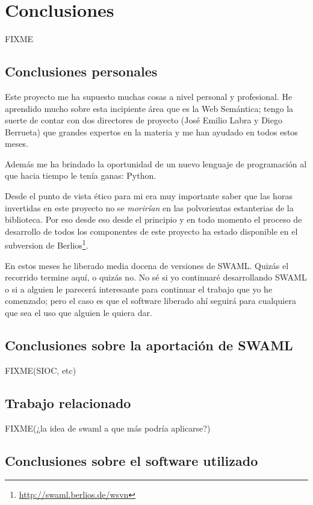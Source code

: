 
\chapter{Conclusiones}

FIXME

\section{Conclusiones personales}

Este proyecto me ha supuesto muchas cosas a nivel personal y profesional. He
aprendido mucho sobre esta incipiente área que es la Web Semántica; tengo la
suerte de contar con dos directores de proyecto (José Emilio Labra y Diego
Berrueta) que grandes expertos en la materia y me han ayudado en todos estos
meses.

Además me ha brindado la oportunidad de un nuevo lenguaje de programación al
que hacia tiempo le tenía ganas: Python.

Desde el punto de vista ético para mi era muy importante saber que las horas
invertidas en este proyecto no se \emph{morirían} en las polvorientas estanterias
de la biblioteca. Por eso desde eso desde el principio y en todo momento el
proceso de desarrollo de todos los componentes de este proyecto ha estado
disponible en el subversion de Berlios\footnote{\url{http://swaml.berlios.de/wsvn}}.

En estos meses he liberado media docena de versiones de SWAML. Quizás el recorrido
termine aquí, o quizás no. No sé si yo continuaré desarrollando SWAML o si a alguien
le parecerá interesante para continuar el trabajo que yo he comenzado; pero el caso
es que el software liberado ahí seguirá para cualquiera que sea el uso que alguien
le quiera dar.

\section{Conclusiones sobre la aportación de SWAML}

FIXME(SIOC, etc)

\section{Trabajo relacionado}

FIXME(¿la idea de swaml a que más podría aplicarse?)

\section{Conclusiones sobre el software utilizado}

